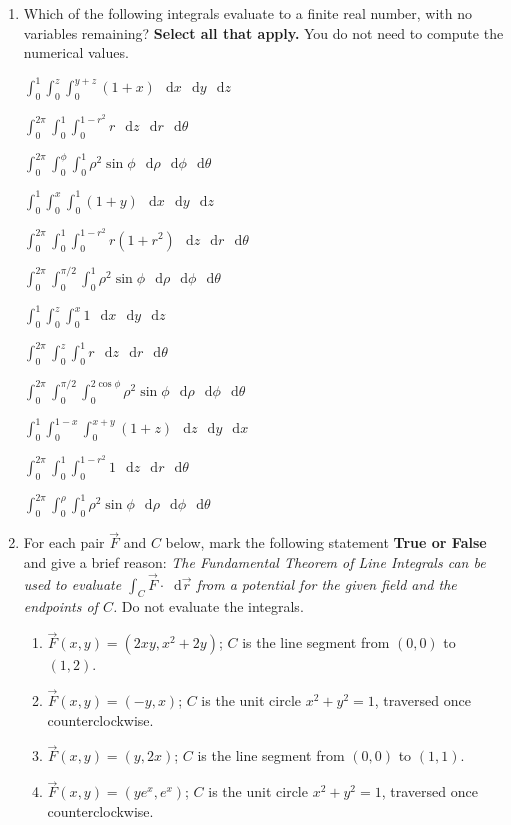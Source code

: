 \documentclass[12pt,letterpaper]{article}
\newcommand{\dd}{\mathop{}\!\mathrm{d}}
\newcommand{\integralchoice}[2]{%
  \par\noindent\makebox[1.8em][l]{(#1)}%
  $\displaystyle #2$\par\vspace{1.2em}}
\begin{document}
\begin{enumerate}[label=\arabic*.,leftmargin=2em,labelsep=0.6em,
                  itemsep=1.1em,parsep=0pt,topsep=0pt]
\item Which of the following integrals evaluate to a finite real
number, with no variables remaining? \textbf{Select all that apply.}
You do not
need to compute the numerical values. 

\medskip
\noindent\begin{minipage}[t]{0.49\linewidth}
\integralchoice{a}{
  \int_0^1\int_0^z\int_0^{y+z}(1+x)\,\dd x\,\dd y\,\dd z}
\integralchoice{c}{
  \int_0^{2\pi}\int_0^1\int_0^{1-r^2}r\,\dd z\,\dd r\,\dd\theta}
\integralchoice{e}{
  \int_0^{2\pi}\int_0^{\phi}\int_0^1
  \rho^2\sin\phi\,\dd\rho\,\dd\phi\,\dd\theta}
\integralchoice{g}{
  \int_0^1\int_0^x\int_0^1(1+y)\,\dd x\,\dd y\,\dd z}
\integralchoice{i}{
  \int_0^{2\pi}\int_0^1\int_0^{1-r^2}
  r(1+r^2)\,\dd z\,\dd r\,\dd\theta}
\integralchoice{k}{
  \int_0^{2\pi}\int_0^{\pi/2}\int_0^1
  \rho^2\sin\phi\,\dd\rho\,\dd\phi\,\dd\theta}
\end{minipage}\hfill
\begin{minipage}[t]{0.49\linewidth}
\integralchoice{b}{
  \int_0^1\int_0^z\int_0^x 1\,\dd x\,\dd y\,\dd z}
\integralchoice{d}{
  \int_0^{2\pi}\int_0^z\int_0^1 r\,\dd z\,\dd r\,\dd\theta}
\integralchoice{f}{
  \int_0^{2\pi}\int_0^{\pi/2}\int_0^{2\cos\phi}
  \rho^2\sin\phi\,\dd\rho\,\dd\phi\,\dd\theta}
\integralchoice{h}{
  \int_0^1\int_0^{1-x}\int_0^{x+y}(1+z)\,\dd z\,\dd y\,\dd x}
\integralchoice{j}{
  \int_0^{2\pi}\int_0^1\int_0^{1-r^2}1\,\dd z\,\dd r\,\dd\theta}
\integralchoice{l}{
  \int_0^{2\pi}\int_0^{\rho}\int_0^1
  \rho^2\sin\phi\,\dd\rho\,\dd\phi\,\dd\theta}
\end{minipage}

\item For each pair $\vec F$ and $C$ below, mark the following statement
\textbf{True or False} and give a brief reason:
\emph{The Fundamental Theorem of Line Integrals can be used to evaluate
$\int_C\vec F\cdot\dd\vec r$ from a potential for the given field and the
endpoints of $C$.} Do not evaluate the integrals.

\begin{enumerate}[label=(\alph*),leftmargin=1.8em,topsep=0.5em,itemsep=0.5em]
  \item $\vec F(x,y)=(2xy,x^2+2y)$; $C$ is the line segment from
        $(0,0)$ to $(1,2)$.
  \item $\vec F(x,y)=(-y,x)$; $C$ is the unit circle $x^2+y^2=1$,
        traversed once counterclockwise.
  \item $\vec F(x,y)=(y,2x)$; $C$ is the line segment from
        $(0,0)$ to $(1,1)$.
  \item $\vec F(x,y)=(ye^x,e^x)$; $C$ is the unit circle $x^2+y^2=1$,
        traversed once counterclockwise.
\end{enumerate}

\end{enumerate}
\end{document}
